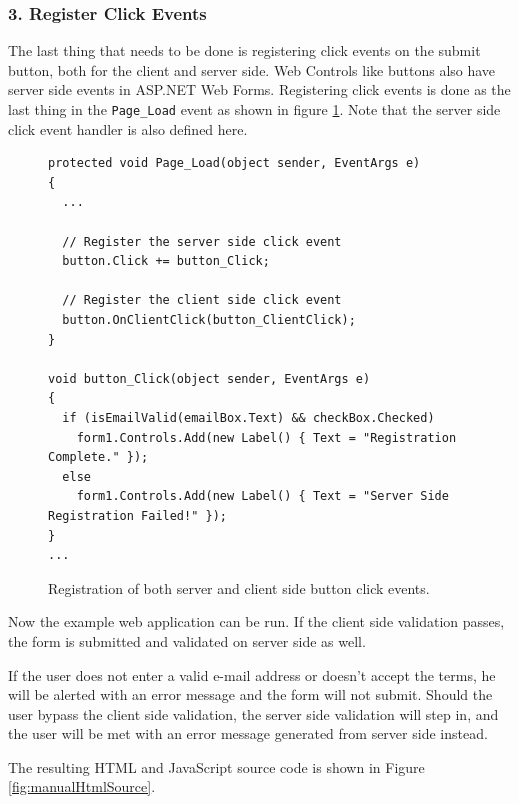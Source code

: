 \subsubsection{3. Register Click Events} %
\label{ssub:3_register_click_events}
	The last thing that needs to be done is registering click events on the submit button, both for the client and server side. Web Controls like buttons also have server side events in ASP.NET Web Forms. Registering click events is done as the last thing in the \texttt{Page\_Load} event as shown in figure \ref{fig:register_events}. Note that the server side click event handler is also defined here.
\begin{figure}[H]
\begin{lstlisting}[language=CSharp,classoffset=1,morekeywords={Default,MiCSPage,Button,CheckBox,TextBox,EventArgs,ClientSide,InputElement,Document,CheckBoxElement,Window,MixedSide,Regex}]
protected void Page_Load(object sender, EventArgs e)
{
  ...

  // Register the server side click event
  button.Click += button_Click;

  // Register the client side click event
  button.OnClientClick(button_ClientClick);
}

void button_Click(object sender, EventArgs e)
{
  if (isEmailValid(emailBox.Text) && checkBox.Checked)
    form1.Controls.Add(new Label() { Text = "Registration Complete." });
  else
    form1.Controls.Add(new Label() { Text = "Server Side Registration Failed!" });
}
...
\end{lstlisting}
\caption{Registration of both server and client side button click events.}
\label{fig:register_events}
\end{figure}


Now the example web application can be run. If the client side validation passes, the form is submitted and validated on server side as well.

If the user does not enter a valid e-mail address or doesn't accept the terms, he will be alerted with an error message and the form will not submit. Should the user bypass the client side validation, the server side validation will step in, and the user will be met with an error message generated from server side instead.

The resulting HTML and JavaScript source code is shown in Figure \ref{fig:manualHtmlSource}.

